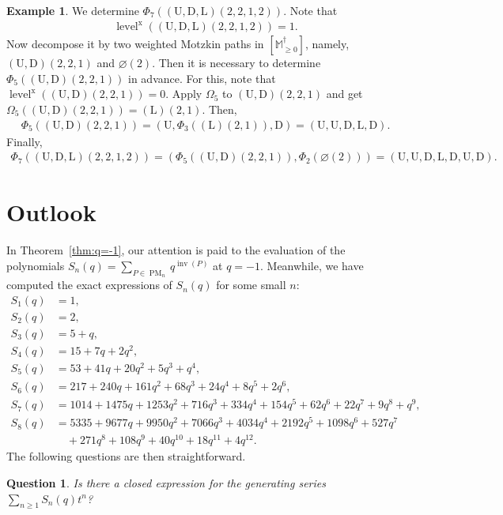 \documentclass[12pt,reqno]{amsart}
\numberwithin{equation}{section}
\theoremstyle{theorem}
\newtheorem{question}[theorem]{Question}
\theoremstyle{definition}
\newtheorem{example}[theorem]{Example}
\theoremstyle{named}
\newcommand{\MatP}{\operatorname{PM}}
\newcommand{\inv}{\operatorname{inv}}
\newcommand{\level}{\operatorname{level}}
\newcommand{\x}{\operatorname{x}}
\newcommand{\bbM}{\mathbb{M}}
\newcommand{\rU}{\mathrm{U}}
\newcommand{\rD}{\mathrm{D}}
\newcommand{\rL}{\mathrm{L}}
\begin{document}
\begin{example}
	We determine $\Phi_7((\rU,\rD,\rL)(2,2,1,2))$. Note that
	\begin{align*}
		\level^{\x}((\rU,\rD,\rL)(2,2,1,2)) = 1.
	\end{align*}
	Now decompose it by two weighted Motzkin paths in $[\bbM_{\ge 0}^\dagger]$, namely, $(\rU,\rD)(2,2,1)$ and $\varnothing(2)$. Then it is necessary to determine $\Phi_5((\rU,\rD)(2,2,1))$ in advance. For this, note that $\level^{\x}((\rU,\rD)(2,2,1)) = 0$. Apply $\Omega_5$ to $(\rU,\rD)(2,2,1)$ and get $\Omega_5((\rU,\rD)(2,2,1)) = (\rL)(2,1)$. Then,
	\begin{align*}
		\Phi_5((\rU,\rD)(2,2,1)) = (\rU, \Phi_3((\rL)(2,1)), \rD) = (\rU, \rU, \rD, \rL, \rD).
	\end{align*}
	Finally,
	\begin{align*}
		\Phi_7((\rU,\rD,\rL)(2,2,1,2)) = (\Phi_5((\rU,\rD)(2,2,1)), \Phi_2(\varnothing(2))) = (\rU, \rU, \rD, \rL, \rD, \rU, \rD).
	\end{align*}
\end{example}

\section{Outlook}\label{sec:outlook}

In Theorem~\ref{thm:q=-1}, our attention is paid to the evaluation of the polynomials $S_n(q) = \sum_{P\in \MatP_{n}} q^{\inv(P)}$ at $q=-1$. Meanwhile, we have computed the exact expressions of $S_n(q)$ for some small $n$:
\begin{align*}
	S_1(q) &= 1,\\
	S_2(q) &= 2,\\
	S_3(q) &= 5 + q,\\
	S_4(q) &= 15 + 7 q + 2 q^2,\\
	S_5(q) &= 53 + 41 q + 20 q^2 + 5 q^3 + q^4,\\
	S_6(q) &= 217 + 240 q + 161 q^2 + 68 q^3 + 24 q^4 + 8 q^5 + 2 q^6,\\
	S_7(q) &= 1014 + 1475 q + 1253 q^2 + 716 q^3 + 334 q^4 + 154 q^5 + 62 q^6 + 22 q^7 + 9 q^8 + q^9,\\
	S_8(q) &= 5335 + 9677 q + 9950 q^2 + 7066 q^3 + 4034 q^4 + 2192 q^5 + 1098 q^6 + 527 q^7 \\
	&\quad + 271 q^8 + 108 q^9 + 40 q^{10} + 18 q^{11} + 4 q^{12}.
\end{align*}
The following questions are then straightforward.

\begin{question}\label{ques:Sn-closed-expr}
	Is there a closed expression for the generating series $\sum_{n\ge 1} S_n(q) t^n$?
\end{question}
\end{document}
